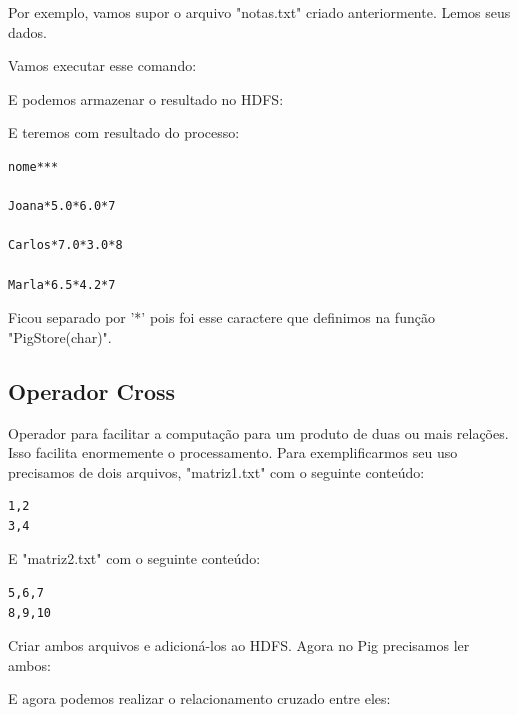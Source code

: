\documentclass[a4paper,11pt]{article}
\begin{document}
Por exemplo, vamos supor o arquivo "notas.txt" criado anteriormente. Lemos seus dados. \\

Vamos executar esse comando: \\

E podemos armazenar o resultado no HDFS: \\

E teremos com resultado do processo:
\begin{lstlisting}[]
nome***

Joana*5.0*6.0*7

Carlos*7.0*3.0*8

Marla*6.5*4.2*7

\end{lstlisting}

Ficou separado por '*' pois foi esse caractere que definimos na função "PigStore(char)".

\subsection{Operador Cross}
Operador para facilitar a computação para um produto de duas ou mais relações. Isso facilita enormemente o processamento. Para exemplificarmos seu uso precisamos de dois arquivos, "matriz1.txt" com o seguinte conteúdo:
\begin{lstlisting}[]
1,2
3,4
\end{lstlisting}

E "matriz2.txt" com o seguinte conteúdo:
\begin{lstlisting}[]
5,6,7
8,9,10
\end{lstlisting}

Criar ambos arquivos e adicioná-los ao HDFS. Agora no Pig precisamos ler ambos: \\

E agora podemos realizar o relacionamento cruzado entre eles: \\
\end{document}
